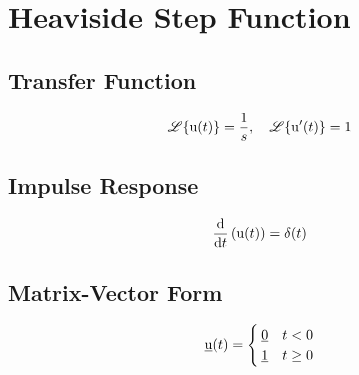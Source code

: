 \section*{Heaviside Step Function}
\subsection*{Transfer Function}
\[
    \laplace{\func{u}[t]} = \frac{1}{s}, \quad \laplace{\func{u^{\prime}}[t]} = 1
\]

\subsection*{Impulse Response}
\[
    \deriv{t}{\func{u}[t]} = \func{\delta}[t]
\]

\subsection*{Matrix-Vector Form}
\[
    \func{\underline{u}}[t] =
    \begin{cases}
        \underline{0} & t < 0 \\
        \underline{1} & t \geq 0
    \end{cases}
\]
